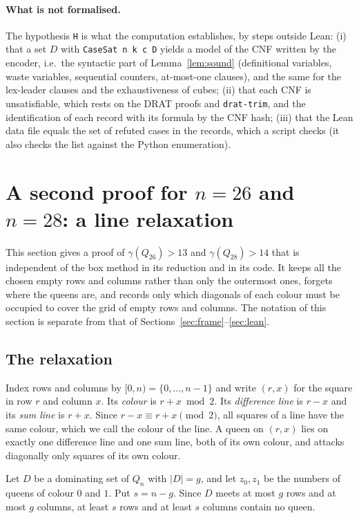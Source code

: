 \documentclass[11pt]{article}
\theoremstyle{definition}
\theoremstyle{remark}
\begin{document}
\paragraph{What is not formalised.} The hypothesis \texttt{H} is what the computation establishes, by
steps outside Lean: (i) that a set $D$ with \texttt{CaseSat n k c D} yields a model of the CNF written by
the encoder, i.e.\ the syntactic part of Lemma~\ref{lem:sound} (definitional variables, waste variables,
sequential counters, at-most-one clauses), and the same for the lex-leader clauses and the exhaustiveness
of cubes; (ii) that each CNF is unsatisfiable, which rests on the DRAT proofs and \texttt{drat-trim}, and
the identification of each record with its formula by the CNF hash; (iii) that the Lean data file equals
the set of refuted cases in the records, which a script checks (it also checks the list against the
Python enumeration).

\section{A second proof for \texorpdfstring{$n=26$ and $n=28$}{n = 26 and n = 28}: a line relaxation}\label{sec:relax}

This section gives a proof of $\gamma(Q_{26})>13$ and $\gamma(Q_{28})>14$ that is independent of the box
method in its reduction and in its code. It keeps all the chosen empty rows and columns rather than only
the outermost ones, forgets where the queens are, and records only which diagonals of each colour must
be occupied to cover the grid of empty rows and columns. The notation of this section is separate from
that of Sections~\ref{sec:frame}--\ref{sec:lean}.

\subsection{The relaxation}


Index rows and columns by $[0,n)=\{0,\dots,n-1\}$ and write $(r,x)$ for the square in row $r$ and
column $x$. Its \emph{colour} is $r+x\bmod 2$. Its \emph{difference line} is $r-x$ and its \emph{sum
line} is $r+x$. Since $r-x\equiv r+x\pmod 2$, all squares of a line have the same colour, which we call
the colour of the line. A queen on $(r,x)$ lies on exactly one difference line and one sum line, both of
its own colour, and attacks diagonally only squares of its own colour.

Let $D$ be a dominating set of $Q_n$ with $|D|=g$, and let $z_0,z_1$ be the numbers of queens of
colour $0$ and $1$. Put $s=n-g$. Since $D$ meets at most $g$ rows and at most $g$ columns, at least $s$
rows and at least $s$ columns contain no queen.
\end{document}
